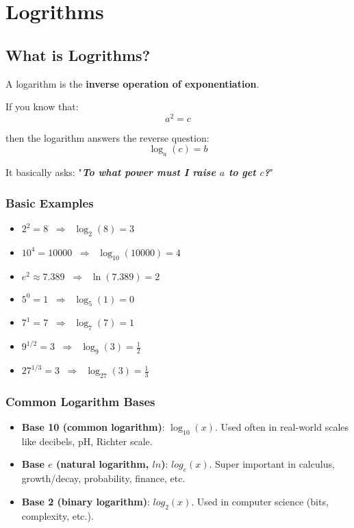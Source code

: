\chapter[Logrithms]{Logrithms}\label{cp:logrithms}

\section{What is Logrithms?}

A logarithm is the \textbf{inverse operation of exponentiation}.

If you know that:
\[
	a^2 = c
\]

then the logarithm answers the reverse question:
\[
	\log_{a}(c) = b
\]

It basically asks: "\textbf{\textit{To what power must I raise $a$ to get $c$?}}"

\subsection{Basic Examples}

\begin{itemize}
	\item $2^2 = 8 \;\;\Rightarrow\;\; \log_{2}(8) = 3$
	      \vspace{2pt}
	\item $10^4 = 10000 \;\;\Rightarrow\;\; \log_{10}(10000) = 4$
	      \vspace{2pt}
	\item $e^2 \approx 7.389 \;\;\Rightarrow\;\; \ln(7.389) = 2$
	      \vspace{2pt}
	\item $5^0 = 1 \;\;\Rightarrow\;\; \log_{5}(1) = 0$
	      \vspace{2pt}
	\item $7^1 = 7 \;\;\Rightarrow\;\; \log_{7}(7) = 1$
	      \vspace{2pt}
	\item $9^{1/2} = 3 \;\;\Rightarrow\;\; \log_{9}(3) = \tfrac{1}{2}$
	      \vspace{2pt}
	\item $27^{1/3} = 3 \;\;\Rightarrow\;\; \log_{27}(3) = \tfrac{1}{3}$
\end{itemize}

\subsection{Common Logarithm Bases}

\begin{itemize}
	\item \textbf{Base 10 (common logarithm)}: $\log_{10}(x)$. Used often in real-world scales like decibels, pH, Richter scale.
	\item \textbf{Base $e$ (natural logarithm, $ln$)}: $log_{e}(x)$. Super important in calculus, growth/decay, probability, finance, etc.
	\item \textbf{Base 2 (binary logarithm)}: $log_{2}(x)$. Used in computer science (bits, complexity, etc.).
\end{itemize}

